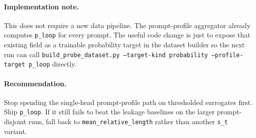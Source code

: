 \documentclass[11pt]{article}
\begin{document}
\paragraph{Implementation note.}
This does not require a new data pipeline. The prompt-profile aggregator already
computes \texttt{p\_loop} for every prompt. The useful code change is just to
expose that existing field as a trainable probability target in the dataset
builder so the next run can call
\texttt{build\_probe\_dataset.py --target-kind probability --profile-target p\_loop}
directly.

\paragraph{Recommendation.}
Stop spending the single-head prompt-profile path on thresholded surrogates first.
Ship \texttt{p\_loop}. If it still fails to beat the leakage baselines on the
larger prompt-disjoint runs, fall back to \texttt{mean\_relative\_length} rather
than another \texttt{s\_t} variant.
\end{document}
